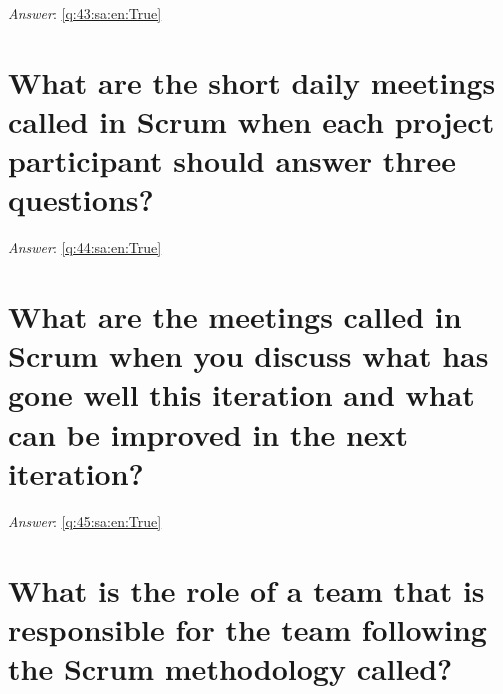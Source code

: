 \documentclass[a4paper,11pt,oneside]{book}
\begin{document}
\begin{sloppypar}
\label{q:43:sa:en:False}

\vspace{2cm}

\noindent\makebox[\textwidth]{\hrulefill}

\vspace{1cm}

\textit{Answer}: \autoref{q:43:sa:en:True}



\section{What are the short daily meetings called in Scrum when each project participant should answer three questions?}

\label{q:44:sa:en:False}

\vspace{2cm}

\noindent\makebox[\textwidth]{\hrulefill}

\vspace{1cm}

\textit{Answer}: \autoref{q:44:sa:en:True}



\section{What are the meetings called in Scrum when you discuss what has gone well this iteration and what can be improved in the next iteration?}

\label{q:45:sa:en:False}

\vspace{2cm}

\noindent\makebox[\textwidth]{\hrulefill}

\vspace{1cm}

\textit{Answer}: \autoref{q:45:sa:en:True}



\section{What is the role of a team that is responsible for the team following the Scrum methodology called?}

\label{q:46:sa:en:False}

\vspace{2cm}

\noindent\makebox[\textwidth]{\hrulefill}


\end{sloppypar}
\end{document}
